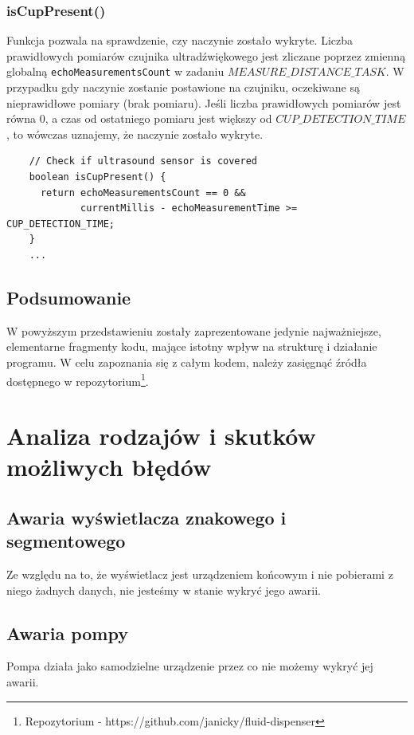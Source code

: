 \documentclass[11pt]{article}
\begin{document}
\subsubsection{isCupPresent()}
Funkcja pozwala na sprawdzenie, czy naczynie zostało wykryte. Liczba prawidłowych pomiarów czujnika ultradźwiękowego jest zliczane poprzez zmienną globalną \texttt{echoMeasurementsCount} w zadaniu $MEASURE\_DISTANCE\_TASK$. W przypadku gdy naczynie zostanie postawione na czujniku, oczekiwane są nieprawidłowe pomiary (brak pomiaru). Jeśli liczba prawidłowych pomiarów jest równa 0, a czas od ostatniego pomiaru jest większy od $CUP\_DETECTION\_TIME$, to wówczas uznajemy, że naczynie zostało wykryte.

\begin{verbatim}
    // Check if ultrasound sensor is covered
    boolean isCupPresent() {
      return echoMeasurementsCount == 0 && 
             currentMillis - echoMeasurementTime >= CUP_DETECTION_TIME;
    }
    ...
\end{verbatim}

\subsection{Podsumowanie}
W powyższym przedstawieniu zostały zaprezentowane jedynie najważniejsze, elementarne fragmenty kodu, mające istotny wpływ na strukturę i działanie programu. W celu zapoznania się z całym kodem, należy zasięgnąć źródła dostępnego w repozytorium\footnote{Repozytorium - https://github.com/janicky/fluid-dispenser}.



\section{Analiza rodzajów i skutków możliwych błędów}
\FloatBarrier

\subsection{Awaria wyświetlacza znakowego i segmentowego}
Ze względu na to, że wyświetlacz jest urządzeniem końcowym i nie pobierami z niego żadnych danych, nie jesteśmy w stanie wykryć jego awarii.

\subsection{Awaria pompy}
Pompa działa jako samodzielne urządzenie przez co nie możemy wykryć jej awarii.
\end{document}
